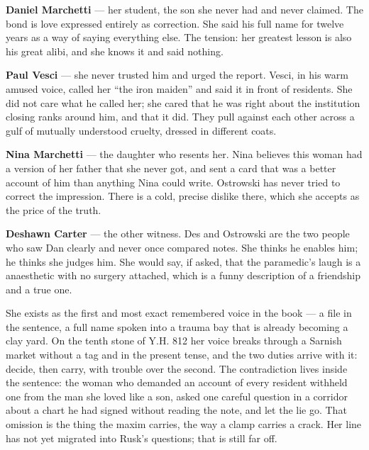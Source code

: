 \documentclass{design/chronicle}
\begin{document}
{
\textbf{Daniel Marchetti} — her student, the son she never had and never claimed. The bond is love expressed entirely as correction. She said his full name for twelve years as a way of saying everything else. The tension: her greatest lesson is also his great alibi, and she knows it and said nothing.

\textbf{Paul Vesci} — she never trusted him and urged the report. Vesci, in his warm amused voice, called her “the iron maiden” and said it in front of residents. She did not care what he called her; she cared that he was right about the institution closing ranks around him, and that it did. They pull against each other across a gulf of mutually understood cruelty, dressed in different coats.

\textbf{Nina Marchetti} — the daughter who resents her. Nina believes this woman had a version of her father that she never got, and sent a card that was a better account of him than anything Nina could write. Ostrowski has never tried to correct the impression. There is a cold, precise dislike there, which she accepts as the price of the truth.

\textbf{Deshawn Carter} — the other witness. Des and Ostrowski are the two people who saw Dan clearly and never once compared notes. She thinks he enables him; he thinks she judges him. She would say, if asked, that the paramedic’s laugh is a anaesthetic with no surgery attached, which is a funny description of a friendship and a true one.

She exists as the first and most exact remembered voice in the book --- a file in the sentence, a full name spoken into a trauma bay that is already becoming a clay yard. On the tenth stone of Y.H. 812 her voice breaks through a Sarnish market without a tag and in the present tense, and the two duties arrive with it: decide, then carry, with trouble over the second. The contradiction lives inside the sentence: the woman who demanded an account of every resident withheld one from the man she loved like a son, asked one careful question in a corridor about a chart he had signed without reading the note, and let the lie go. That omission is the thing the maxim carries, the way a clamp carries a crack. Her line has not yet migrated into Rusk’s questions; that is still far off.

\begin{itemize}[leftmargin=1.4em,itemsep=1pt,topsep=3pt,parsep=0pt]


\end{itemize}}
\end{document}

